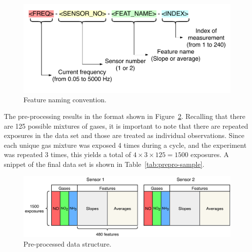 \begin{figure}[h]
	\centering
	\includegraphics[width=1\textwidth]{../figures/feat-naming.pdf}
	\caption{Feature naming convention.}
	\label{fig:feat-naming}
\end{figure}

The pre-processing results in the format shown in Figure~\ref{fig:preprocessed-data}. Recalling that there are 125 possible mixtures of gases, it is important to note that there are repeated exposures in the data set and those are treated as individual observations. Since each unique gas mixture was exposed 4 times during a cycle, and the experiment was repeated 3 times, this yields a total of $4 \times 3 \times 125 = 1500$ exposures. A snippet of the final data set is shown in Table~\ref{tab:prepro-sample}.

\begin{figure}[h]
	\centering
	\includegraphics[width=1\textwidth]{../figures/preprocessed-data.pdf}
	\caption{Pre-processed data structure.}
	\label{fig:preprocessed-data}
\end{figure}

